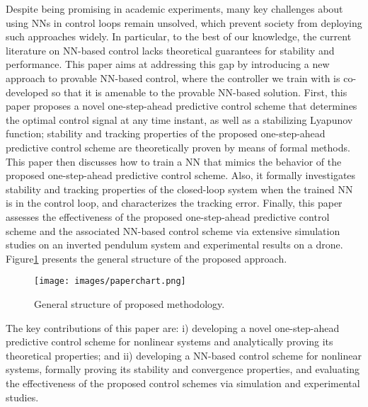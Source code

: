 \documentclass[1p,times]{elsarticle}
\begin{document}






{{\color{blue}}Despite being promising in academic experiments, many key challenges about using NNs in control loops remain unsolved, which prevent society from deploying such approaches widely. In particular, to the best of our knowledge, the current literature on NN-based control lacks theoretical guarantees for stability and performance.} This paper aims at addressing this gap by introducing a new approach to provable NN-based control, where the controller we train with is co-developed so that it is amenable to the provable NN-based solution. First, this paper proposes a novel one-step-ahead predictive control scheme that determines the optimal control signal at any time instant, as well as a stabilizing Lyapunov function; stability and tracking properties of the proposed one-step-ahead predictive control scheme are theoretically proven by means of formal methods. This paper then discusses how to train a NN that mimics the behavior of the proposed one-step-ahead predictive control scheme. Also, it formally investigates stability and tracking properties of the closed-loop system when the trained NN is in the control loop, and characterizes the tracking error. Finally, this paper assesses the effectiveness of the proposed one-step-ahead predictive control scheme and the associated NN-based control scheme via extensive simulation studies on an inverted pendulum system and experimental results on a drone. Figure\ref{fig:paperchart} presents the general structure of the proposed approach.


\begin{figure}[!t]
    \centering
    \texttt{[image: images/paperchart.png]}
    \caption{{{\color{blue}}General structure of proposed methodology.}}
    \label{fig:paperchart}
\end{figure}


{{\color{blue}}
The key contributions of this paper are: i) developing a novel one-step-ahead predictive control scheme for nonlinear systems and analytically proving its theoretical properties; and ii) developing a NN-based control scheme for nonlinear systems, formally proving its stability and convergence properties, and evaluating the effectiveness of the proposed control schemes via simulation and experimental studies}. 
\end{document}
